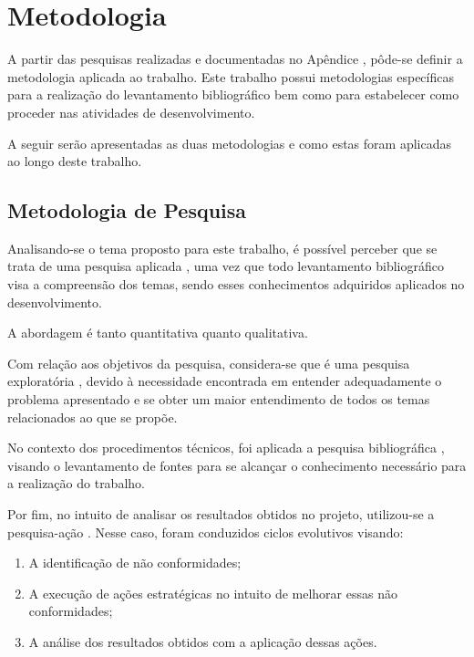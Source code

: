 \chapter{Metodologia}
\label{chapter:Metodologia}

A partir das pesquisas realizadas e documentadas no Apêndice , pôde-se definir a metodologia aplicada ao trabalho. Este trabalho possui metodologias específicas para a realização do levantamento bibliográfico bem como para estabelecer como proceder nas atividades de desenvolvimento.

A seguir serão apresentadas as duas metodologias e como estas foram aplicadas ao longo deste trabalho.

\section{Metodologia de Pesquisa}

Analisando-se o tema proposto para este trabalho, é possível perceber que se trata de uma pesquisa aplicada \cite{Silva:Tafner:2007}, uma vez que todo levantamento bibliográfico visa a compreensão dos temas, sendo esses conhecimentos adquiridos aplicados no desenvolvimento.

A abordagem é tanto quantitativa quanto qualitativa.

Com relação aos objetivos da pesquisa, considera-se que é uma pesquisa exploratória \cite{Gil:2010}, devido à necessidade encontrada em entender adequadamente o problema apresentado e se obter um maior entendimento de todos os temas relacionados ao que se propõe.

No contexto dos procedimentos técnicos, foi aplicada a pesquisa bibliográfica \cite{Silva:Tafner:2007}, visando o levantamento de fontes para se alcançar o conhecimento necessário para a realização do trabalho.

Por fim, no intuito de analisar os resultados obtidos no projeto, utilizou-se a pesquisa-ação \cite{Silva:Tafner:2007}. Nesse caso, foram conduzidos ciclos evolutivos visando:

\begin{enumerate}
	\item A identificação de não conformidades;
	\item A execução de ações estratégicas no intuito de melhorar essas não conformidades;
	\item A análise dos resultados obtidos com a aplicação dessas ações.
\end{enumerate}

